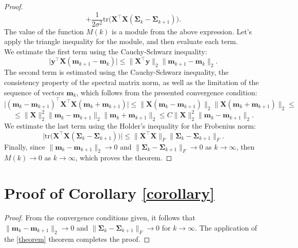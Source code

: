 \documentclass[runningheads]{llncs}
\begin{document}
\begin{proof}
    \[ + \dfrac{1}{2\sigma^2} \text{tr} \Big( \mathbf{X}^{\top}\mathbf{X} \left( \mathbf{\Sigma}_k - \mathbf{\Sigma}_{k+1} \right) \Big). \]
The value of the function $M(k)$ is a module from the above expression. Let's apply the triangle inequality for the module, and then evaluate each term.\\
We estimate the first term using the Cauchy-Schwarz inequality:
\[\big| \mathbf{y}^{\top}\mathbf{X}(\mathbf{m}_{k+1}-\mathbf{m}_k)\big| \leqslant \| \mathbf{X}^{\top}\mathbf{y} \|_2 \|\mathbf{m}_{k+1} - \mathbf{m}_k\|_2. \]
    The second term is estimated using the Cauchy-Schwarz inequality, the consistency property of the spectral matrix norm, as well as the limitation of the sequence of vectors $\mathbf{m}_k$, which follows from the presented convergence condition:
\[\big| (\mathbf{m}_k - \mathbf{m}_{k+1})^{\top} \mathbf{X}^{\top}\mathbf{X} (\mathbf{m}_k + \mathbf{m}_{k+1}) \big| \leqslant \| \mathbf{X} (\mathbf{m}_k - \mathbf{m}_{k+1}) \|_2 \| \mathbf{X} (\mathbf{m}_k + \mathbf{m}_{k+1}) \|_2 \leqslant \]
    \[ \leqslant \| \mathbf{X} \|_2^2 \| \mathbf{m}_k - \mathbf{m}_{k+1} \|_2 \| \mathbf{m}_k + \mathbf{m}_{k+1} \|_2 \leqslant C \| \mathbf{X} \|_2^2 \| \mathbf{m}_k - \mathbf{m}_{k+1} \|_2. \]
    We estimate the last term using the Holder's inequality for the Frobenius norm:
    \[ \Big| \text{tr} \Big( \mathbf{X}^{\top}\mathbf{X} \left( \mathbf{\Sigma}_k - \mathbf{\Sigma}_{k+1} \right) \Big) \Big| \leqslant \| \mathbf{X}^{\top}\mathbf{X} \|_F \| \mathbf{\Sigma}_k - \mathbf{\Sigma}_{k+1} \|_F. \]
Finally, since $\|\mathbf{m}_k - \mathbf{m}_{k+1} \|_2\to 0$ and $\|\mathbf{\Sigma}_k - \mathbf{\Sigma}_{k+1}\|_{F}\to 0$ as $k\to\infty$, then $M(k)\to 0$ as $k\to \infty$, which proves the theorem.
\end{proof}

\section{Proof of Corollary \ref{corollary}}

\begin{proof}
    From the convergence conditions given, it follows that $\|\mathbf{m}_k - \mathbf{m}_{k+1} \|_2\to 0$ and $\|\mathbf{\Sigma}_k -\mathbf{\Sigma}_{k+1}\|_{F}\to 0$ for $k\to \infty$. The application of the \ref{theorem} theorem completes the proof.
\end{proof}
\end{document}
